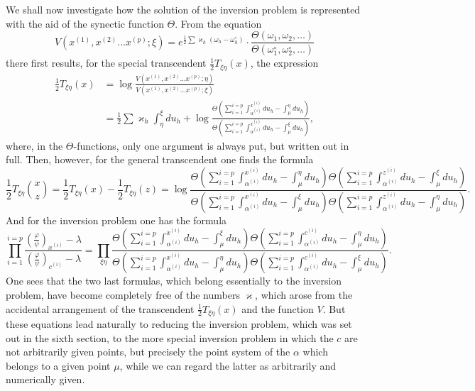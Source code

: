 \documentclass[10pt]{article}
\begin{document}
We shall now investigate how the solution of the inversion problem is represented with the aid of the synectic function \(\Theta\). From the equation
\[
V(x^{(1)},x^{(2)}\ldots x^{(p)};\xi)
=e^{\frac12\sum\varkappa_h(\omega_h-\omega_h^\circ)}
\cdot\frac{\Theta(\omega_1,\omega_2,\ldots)}
{\Theta(\omega_1^\circ,\omega_2^\circ,\ldots)}
\]
there first results, for the special transcendent \(\frac12T_{\xi\eta}(x)\), the expression
\[
\begin{aligned}
\frac12T_{\xi\eta}(x)
&=\log\frac{V(x^{(1)},x^{(2)}\ldots x^{(p)};\eta)}
{V(x^{(1)},x^{(2)}\ldots x^{(p)};\xi)}\\
&=\frac12\sum\varkappa_h\int_{\eta}^{\xi}du_h
+\log\frac{\Theta\!\left(\sum_{i=1}^{i=p}\int_{\alpha^{(i)}}^{x^{(i)}}du_h-\int_{\mu}^{\eta}du_h\right)}
{\Theta\!\left(\sum_{i=1}^{i=p}\int_{\alpha^{(i)}}^{x^{(i)}}du_h-\int_{\mu}^{\xi}du_h\right)},
\end{aligned}
\]
where, in the \(\Theta\)-functions, only one argument is always put, but written out in full. Then, however, for the general transcendent one finds the formula
\[
\tag{1}
\frac12T_{\xi\eta}\binom{x}{z}
=\frac12T_{\xi\eta}(x)-\frac12T_{\xi\eta}(z)
=\log\frac{
\Theta\!\left(\sum_{i=1}^{i=p}\int_{\alpha^{(i)}}^{x^{(i)}}du_h-\int_{\mu}^{\eta}du_h\right)
\Theta\!\left(\sum_{i=1}^{i=p}\int_{\alpha^{(i)}}^{z^{(i)}}du_h-\int_{\mu}^{\xi}du_h\right)}
{\Theta\!\left(\sum_{i=1}^{i=p}\int_{\alpha^{(i)}}^{x^{(i)}}du_h-\int_{\mu}^{\xi}du_h\right)
\Theta\!\left(\sum_{i=1}^{i=p}\int_{\alpha^{(i)}}^{z^{(i)}}du_h-\int_{\mu}^{\eta}du_h\right)}.
\]
And for the inversion problem one has the formula
\[
\tag{2}
\prod_{i=1}^{i=p}
\frac{\left(\frac{\varphi}{\psi}\right)_{x^{(i)}}-\lambda}
{\left(\frac{\varphi}{\psi}\right)_{c^{(i)}}-\lambda}
=
\prod_{\xi\eta}
\frac{
\Theta\!\left(\sum_{i=1}^{i=p}\int_{\alpha^{(i)}}^{x^{(i)}}du_h-\int_{\mu}^{\xi}du_h\right)
\Theta\!\left(\sum_{i=1}^{i=p}\int_{\alpha^{(i)}}^{c^{(i)}}du_h-\int_{\mu}^{\eta}du_h\right)}
{\Theta\!\left(\sum_{i=1}^{i=p}\int_{\alpha^{(i)}}^{x^{(i)}}du_h-\int_{\mu}^{\eta}du_h\right)
\Theta\!\left(\sum_{i=1}^{i=p}\int_{\alpha^{(i)}}^{c^{(i)}}du_h-\int_{\mu}^{\xi}du_h\right)}.
\]
One sees that the two last formulas, which belong essentially to the inversion problem, have become completely free of the numbers \(\varkappa\), which arose from the accidental arrangement of the transcendent \(\frac12T_{\xi\eta}(x)\) and the function \(V\). But these equations lead naturally to reducing the inversion problem, which was set out in the sixth section, to the more special inversion problem in which the \(c\) are not arbitrarily given points, but precisely the point system of the \(\alpha\) which belongs to a given point \(\mu\), while we can regard the latter as arbitrarily and numerically given.
\end{document}
